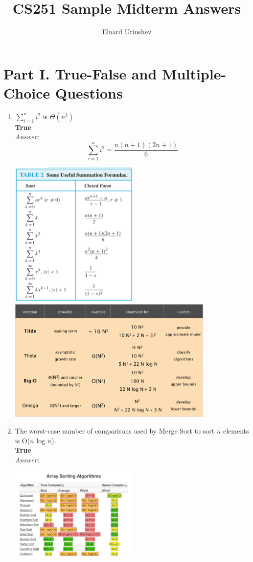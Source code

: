 \documentclass[a4paper]{article}
\title{CS251 Sample Midterm Answers}
\author{Elnard Utiushev}
\newcommand{\ans}{\textit{Answer: }}
\begin{document}
\maketitle

\section*{Part I. True-False and Multiple-Choice Questions}
\begin{enumerate}
  \item $\sum_{i=1}^{n}i^2$ is $\Theta(n^3)$ \\
  \textbf{True} \\
  \ans 
  $$\sum_{i=1}^{n}i^2 = \frac{n(n+1)(2n+1)}{6}$$
  \begin{center}
    \includegraphics[width=0.5\textwidth]{fig1.png}
    \includegraphics[width=0.8\textwidth]{fig2.png}
  \end{center}

  \item The worst-case number of comparisons used by Merge Sort to sort $n$ elements is
  O($n$ log $n$). \\
  \textbf{True} \\
  \ans
  \begin{center}
    \includegraphics[width=0.5\textwidth]{fig3.png}
  \end{center}


\end{enumerate}
\end{document}
